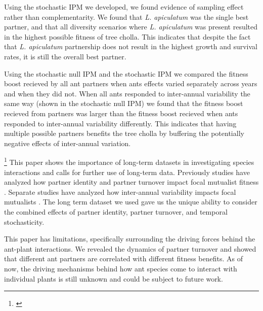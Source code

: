 \documentclass[11pt]{article}
\newcommand{\ali}[2]{{\color{blue}{#1}}\footnote{\textit{\color{blue}{#2}}}}
\begin{document}
Using the stochastic IPM we developed, we found evidence of sampling effect rather than complementarity.
We found that \textit{L. apiculatum} was the single best partner, and that all diversity scenarios where \textit{L. apiculatum} was present resulted in the highest possible fitness of tree cholla. 
This indicates that despite the fact that \textit{L. apiculatum} partnership does not result in the highest growth and survival rates, it is still the overall best partner. 

Using the stochastic null IPM and the stochastic IPM we compared the fitness boost recieved by all ant partners when ants effects varied separately across years and when they did not. 
When all ants responded to inter-annual variability the same way (shown in the stochastic null IPM) we found that the fitness boost recieved from partners was larger than the fitness boost recieved when ants responded to inter-annual variability differently.
This indicates that having multiple possible partners benefits the tree cholla by buffering the potentially negative effects of inter-annual variation. 

\ali{}{What this all means more broadly?? I'm currently not sure what to do with this}
This paper shows the importance of long-term datasets in investigating species interactions and calls for further use of long-term data. 
Previously studies have analyzed how partner identity and partner turnover impact focal mutualist fitness \cite{Fonseca2003, Dejean2008, Noe1994, Barrett2015, Bruna2014, Trojelsgaard2015}.
Separate studies have analyzed how inter-annual variability impacts focal mutualists \cite{Alonso1998, Alarcon2008, Ollerton2006, Horvitz1990, Lazaro2022}.
The long term dataset we used gave us the unique ability to consider the combined effects of partner identity, partner turnover, and temporal stochasticity.


This paper has limitations, specifically surrounding the driving forces behind the ant-plant interactions.
We revealed the dynamics of partner turnover and showed that different ant partners are correlated with different fitness benefits.
As of now, the driving mechanisms behind how ant species come to interact with individual plants is still unknown and could be subject to future work. 
\end{document}
